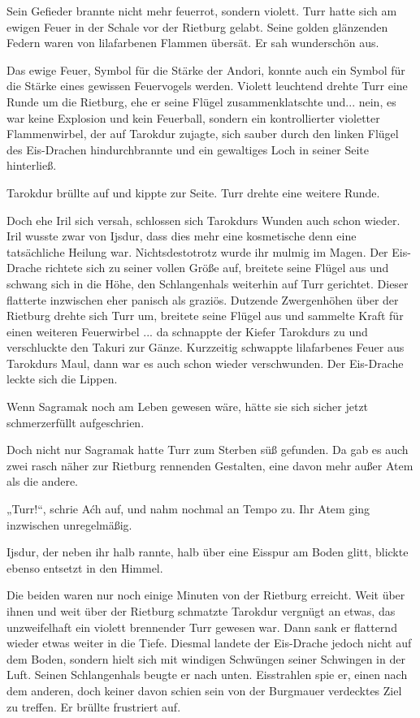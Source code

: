 Sein Gefieder brannte nicht mehr feuerrot, sondern violett. Turr hatte sich am ewigen Feuer in der Schale vor der Rietburg gelabt. Seine golden glänzenden Federn waren von lilafarbenen Flammen übersät. Er sah wunderschön aus.

Das ewige Feuer, Symbol für die Stärke der Andori, konnte auch ein Symbol für die Stärke eines gewissen Feuervogels werden. Violett leuchtend drehte Turr eine Runde um die Rietburg, ehe er seine Flügel zusammenklatschte und... nein, es war keine Explosion und kein Feuerball, sondern ein kontrollierter violetter Flammenwirbel, der auf Tarokdur zujagte, sich sauber durch den linken Flügel des Eis-Drachen hindurchbrannte und ein gewaltiges Loch in seiner Seite hinterließ.

Tarokdur brüllte auf und kippte zur Seite. Turr drehte eine weitere Runde.

Doch ehe Iril sich versah, schlossen sich Tarokdurs Wunden auch schon wieder. Iril wusste zwar von Ijsdur, dass dies mehr eine kosmetische denn eine tatsächliche Heilung war. Nichtsdestotrotz wurde ihr mulmig im Magen. Der Eis-Drache richtete sich zu seiner vollen Größe auf, breitete seine Flügel aus und schwang sich in die Höhe, den Schlangenhals weiterhin auf Turr gerichtet. Dieser flatterte inzwischen eher panisch als graziös. Dutzende Zwergenhöhen über der Rietburg drehte sich Turr um, breitete seine Flügel aus und sammelte Kraft für einen weiteren Feuerwirbel ... da schnappte der Kiefer Tarokdurs zu und verschluckte den Takuri zur Gänze. Kurzzeitig schwappte lilafarbenes Feuer aus Tarokdurs Maul, dann war es auch schon wieder verschwunden. Der Eis-Drache leckte sich die Lippen.

Wenn Sagramak noch am Leben gewesen wäre, hätte sie sich sicher jetzt schmerzerfüllt aufgeschrien.

Doch nicht nur Sagramak hatte Turr zum Sterben süß gefunden. Da gab es auch zwei rasch näher zur Rietburg rennenden Gestalten, eine davon mehr außer Atem als die andere.



\trennzeichen



„Turr!“, schrie Aćh auf, und nahm nochmal an Tempo zu. Ihr Atem ging inzwischen unregelmäßig.

Ijsdur, der neben ihr halb rannte, halb über eine Eisspur am Boden glitt, blickte ebenso entsetzt in den Himmel.

Die beiden waren nur noch einige Minuten von der Rietburg erreicht. Weit über ihnen und weit über der Rietburg schmatzte Tarokdur vergnügt an etwas, das unzweifelhaft ein violett brennender Turr gewesen war. Dann sank er flatternd wieder etwas weiter in die Tiefe. Diesmal landete der Eis-Drache jedoch nicht auf dem Boden, sondern hielt sich mit windigen Schwüngen seiner Schwingen in der Luft. Seinen Schlangenhals beugte er nach unten. Eisstrahlen spie er, einen nach dem anderen, doch keiner davon schien sein von der Burgmauer verdecktes Ziel zu treffen. Er brüllte frustriert auf.

